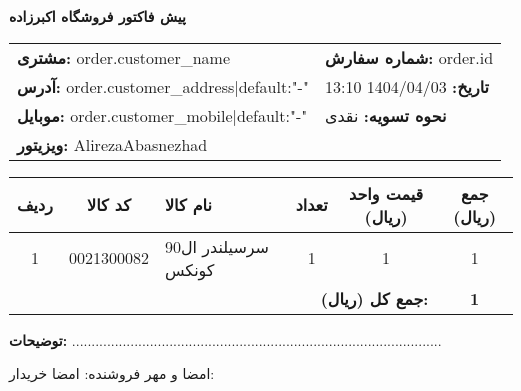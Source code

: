 \documentclass[a4paper,12pt]{article}
\begin{document}
        \begin{center}
            {\Huge \textbf{پیش فاکتور فروشگاه اکبرزاده}}
        \end{center}

        \vspace{0.6cm}

        \noindent
        \begin{tabular}{ p{7cm} p{7cm} }
        \textbf{مشتری:} {{ order.customer_name }} & \textbf{شماره سفارش:} {{ order.id }} \\
        \textbf{آدرس:} {{ order.customer_address|default:"-" }} & \textbf{تاریخ:} 1404/04/03 13:10 \\
        \textbf{موبایل:} {{ order.customer_mobile|default:"-" }} & \textbf{نحوه تسویه:} نقدی \\
        \textbf{ویزیتور:} AlirezaAbasnezhad & \\
        \end{tabular}

        \vspace{1cm}

        \begin{longtable}{|c|c|p{5cm}|c|c|c|}
        \hline
        \rowcolor{headerblue} \color{white}
        \textbf{ردیف} & \textbf{کد کالا} & \textbf{نام کالا} & \textbf{تعداد} & \textbf{قیمت واحد (ریال)} & \textbf{جمع (ریال)} \\
        \hline
        \endhead
        1 & 0021300082 & سرسيلندر ال90 کونکس & 1 & 1 & 1 \\
\hline

        \multicolumn{5}{|r|}{\textbf{جمع کل (ریال):}} & \textbf{1} \\
        \hline
        \end{longtable}

        \vspace{0.6cm}

        \noindent
        \textbf{توضیحات:} ...............................................................................................

        \vspace{2cm}

        \begin{flushleft}
            امضا و مهر فروشنده: \hspace{7cm} امضا خریدار:
        \end{flushleft}

        
\end{document}
